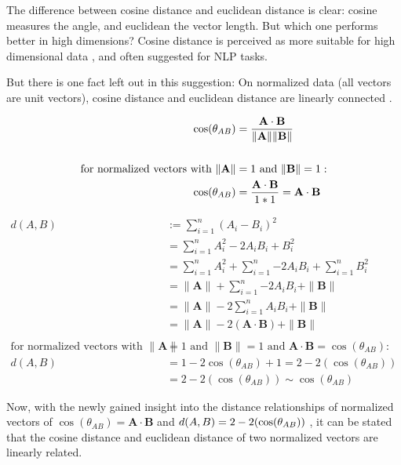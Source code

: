 		The difference between cosine distance and euclidean distance is clear: cosine measures the angle, and euclidean the vector length. But which one performs better in high dimensions? Cosine distance is perceived as more suitable for high dimensional data \cite[c.2.1.2.1]{40algorithms}, and often suggested for \ac{NLP} tasks. 
		
		But there is one fact left out in this suggestion: On normalized data (all vectors are unit vectors), cosine distance and euclidean distance are linearly connected \cite{khanRelationshipCosineSimilarity2020}.
		
		\begin{align*}
			\cos(\theta_{AB}) &= {\mathbf{A} \cdot \mathbf{B} \over \|\mathbf{A}\| \|\mathbf{B}\|}  \\
			\\
			\text{for normalized vectors with } \|\mathbf{A}\| &=1 \text{ and } \|\mathbf{B}\| =1: \\
			\cos(\theta_{AB}) &=  {\mathbf{A} \cdot \mathbf{B} \over 1 * 1 } = \mathbf{A} \cdot \mathbf{B}
		\end{align*}
		
		\begin{align*}
			d(A, B) &:=  \sum\limits_{i=1}^{n}{(A_i -  B_i)^{2}} \\
			&= \sum\limits_{i=1}^{n}{A_i^{2} - 2A_iB_i + B_i^2}  \\ 
			&= \sum\limits_{i=1}^{n}{A_i^{2}} + \sum\limits_{i=1}^{n}{- 2A_iB_i} + \sum\limits_{i=1}^{n}{B_i^2} \\
			&= 	\|\mathbf{A}\| + \sum\limits_{i=1}^{n}{- 2A_iB_i} + \|\mathbf{B}\| \\
			&= \|\mathbf{A}\| -2 \sum\limits_{i=1}^{n}{A_iB_i} + \|\mathbf{B}\| \\
			&= \|\mathbf{A}\| -2 (\mathbf{A} \cdot \mathbf{B}) + \|\mathbf{B}\| \\
			\\
			\text{for normalized vectors with }\|\mathbf{A}\| &=1 \text{ and } \|\mathbf{B}\| =1  \text{ and } \mathbf{A} \cdot \mathbf{B}  = \cos(\theta_{AB}):\\
			d(A, B) &= 1 - 2 \cos(\theta_{AB}) + 1 = 2 - 2(\cos(\theta_{AB})) \\
			&= 2 - 2(\cos(\theta_{AB})) \sim \cos(\theta_{AB})
		\end{align*}
	
		Now, with the newly gained insight into the distance relationships of normalized vectors of $\cos(\theta_{AB}) = \mathbf{A} \cdot \mathbf{B}$ and $d(A, B) = 2 - 2(\cos(\theta_{AB})) \\$ , it can be stated that the cosine distance and euclidean distance of two normalized vectors are linearly related.
				
